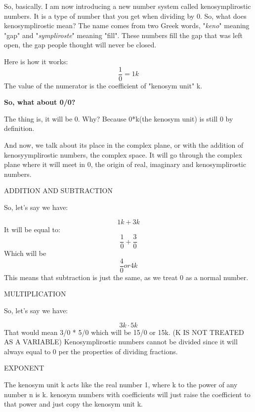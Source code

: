 \documentclass[12pt]{article}
\begin{document}
\begin{flushleft}
So, basically. I am now introducing a new number system called kenosymplirostic numbers.
It is a type of number that you get when dividing by 0.
So, what does kenosymplirostic mean?
The name comes from two Greek words, "\textit{keno}" meaning "gap" and "\textit{sympliroste}" meaning "fill".
These numbers fill the gap that was left open, the gap people thought will never be closed.
\end{flushleft}

Here is how it works:
\[\frac{1}{0}= 1\mathit{k}\]
The value of the numerator is the coefficient of "kenosym unit" k.

\textbf{So, what about 0/0?}
\begin{flushleft}
The thing is, it will be 0. Why? Because 0*k(the kenosym unit) is still 0 by definition.
\end{flushleft}



\begin{flushleft}
And now, we talk about its place in the complex plane, or with the addition of 
kenosyymplirostic numbers, the complex space.
It will go through the complex plane where it will meet in 0, the origin of real, imaginary and
kenosymplirostic numbers.
\end{flushleft}

ADDITION AND SUBTRACTION
\begin{flushleft}
So, let's say we have:
\end{flushleft}

\[1\mathit{k}+3\mathit{k}\]
It will be equal to:
\[\frac{1}{0}+\frac{3}{0}\]
Which will be
\[\frac{4}{0} or 4\mathit{k}\]
This means that subtraction is just the same, as we treat 0 as a normal number.

MULTIPLICATION
\begin{flushleft}
So, let's say we have:
\end{flushleft}
\[3k \cdot 5k\]
That would mean 3/0 * 5/0 which will be 15/0 or 15k.
(K IS NOT TREATED AS A VARIABLE)
Kenosymplirostic numbers cannot be divided since it will always equal to 0 per the properties
of dividing fractions.

EXPONENT
\begin{flushleft}
The kenosym unit k acts like the real number 1, where k to the power of any number n is k.
kenosym numbers with coefficients will just raise the coefficient to that power and just
copy the kenosym unit k.
\end{flushleft}
\end{document}
